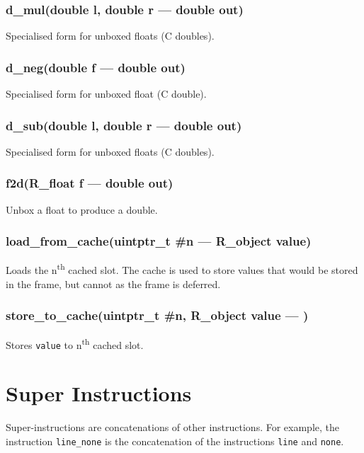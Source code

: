 \subsubsection{d\_mul(double l, double r --- double out)}
\vspace{-1em}Specialised form for unboxed floats (C doubles). \vspace{-1em}
\subsubsection{d\_neg(double f --- double out)}
\vspace{-1em}Specialised form for unboxed float (C double). \vspace{-1em}
\subsubsection{d\_sub(double l, double r --- double out)}
\vspace{-1em}Specialised form for unboxed floats (C doubles). \vspace{-1em}
\subsubsection{f2d(R\_float f --- double out)}
\vspace{-1em}Unbox a float to produce a double. \vspace{-1em}
\subsubsection{load\_from\_cache(uintptr\_t \#n --- R\_object value)}
\vspace{-1em}Loads the n\textsuperscript{th} cached slot.  The cache is used to store values that would be stored in the frame,  but cannot as the frame is deferred. \vspace{-1em}
\subsubsection{store\_to\_cache(uintptr\_t \#n, R\_object value --- )}
\vspace{-1em}Stores \texttt{value} to n\textsuperscript{th} cached slot. \vspace{-1em}
\section{Super Instructions}

        Super-instructions are concatenations of other instructions.
        For example, the instruction \verb|line_none| is the concatenation
        of the instructions \verb|line| and \verb|none|.
